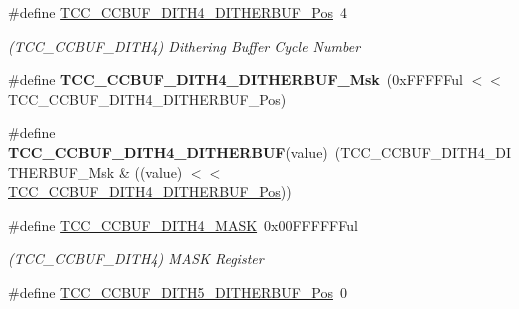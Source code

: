 \begin{DoxyCompactItemize}
\item 
\hypertarget{group___s_a_m_l21___t_c_c_ga56cd1d9b8f79db20d77e21b66088b1e8}{}\#define \hyperlink{group___s_a_m_l21___t_c_c_ga56cd1d9b8f79db20d77e21b66088b1e8}{T\+C\+C\+\_\+\+C\+C\+B\+U\+F\+\_\+\+D\+I\+T\+H4\+\_\+\+D\+I\+T\+H\+E\+R\+B\+U\+F\+\_\+\+Pos}~4\label{group___s_a_m_l21___t_c_c_ga56cd1d9b8f79db20d77e21b66088b1e8}

\begin{DoxyCompactList}\small\item\em (T\+C\+C\+\_\+\+C\+C\+B\+U\+F\+\_\+\+D\+I\+T\+H4) Dithering Buffer Cycle Number \end{DoxyCompactList}\item 
\hypertarget{group___s_a_m_l21___t_c_c_ga67251cbd7cc8dd0e941365623e2f2515}{}\#define {\bfseries T\+C\+C\+\_\+\+C\+C\+B\+U\+F\+\_\+\+D\+I\+T\+H4\+\_\+\+D\+I\+T\+H\+E\+R\+B\+U\+F\+\_\+\+Msk}~(0x\+F\+F\+F\+F\+Ful $<$$<$ T\+C\+C\+\_\+\+C\+C\+B\+U\+F\+\_\+\+D\+I\+T\+H4\+\_\+\+D\+I\+T\+H\+E\+R\+B\+U\+F\+\_\+\+Pos)\label{group___s_a_m_l21___t_c_c_ga67251cbd7cc8dd0e941365623e2f2515}

\item 
\hypertarget{group___s_a_m_l21___t_c_c_gab1a92af8d3641c86fa44ee58b7a871b7}{}\#define {\bfseries T\+C\+C\+\_\+\+C\+C\+B\+U\+F\+\_\+\+D\+I\+T\+H4\+\_\+\+D\+I\+T\+H\+E\+R\+B\+U\+F}(value)~(T\+C\+C\+\_\+\+C\+C\+B\+U\+F\+\_\+\+D\+I\+T\+H4\+\_\+\+D\+I\+T\+H\+E\+R\+B\+U\+F\+\_\+\+Msk \& ((value) $<$$<$ \hyperlink{group___s_a_m_l21___t_c_c_ga56cd1d9b8f79db20d77e21b66088b1e8}{T\+C\+C\+\_\+\+C\+C\+B\+U\+F\+\_\+\+D\+I\+T\+H4\+\_\+\+D\+I\+T\+H\+E\+R\+B\+U\+F\+\_\+\+Pos}))\label{group___s_a_m_l21___t_c_c_gab1a92af8d3641c86fa44ee58b7a871b7}

\item 
\hypertarget{group___s_a_m_l21___t_c_c_ga7f0191b348f8a665a14bf9441cfc8c89}{}\#define \hyperlink{group___s_a_m_l21___t_c_c_ga7f0191b348f8a665a14bf9441cfc8c89}{T\+C\+C\+\_\+\+C\+C\+B\+U\+F\+\_\+\+D\+I\+T\+H4\+\_\+\+M\+A\+S\+K}~0x00\+F\+F\+F\+F\+F\+Ful\label{group___s_a_m_l21___t_c_c_ga7f0191b348f8a665a14bf9441cfc8c89}

\begin{DoxyCompactList}\small\item\em (T\+C\+C\+\_\+\+C\+C\+B\+U\+F\+\_\+\+D\+I\+T\+H4) M\+A\+S\+K Register \end{DoxyCompactList}\item 
\hypertarget{group___s_a_m_l21___t_c_c_ga5325e0f965412c0dceb39f73fae14592}{}\#define \hyperlink{group___s_a_m_l21___t_c_c_ga5325e0f965412c0dceb39f73fae14592}{T\+C\+C\+\_\+\+C\+C\+B\+U\+F\+\_\+\+D\+I\+T\+H5\+\_\+\+D\+I\+T\+H\+E\+R\+B\+U\+F\+\_\+\+Pos}~0\label{group___s_a_m_l21___t_c_c_ga5325e0f965412c0dceb39f73fae14592}


\end{DoxyCompactItemize}
